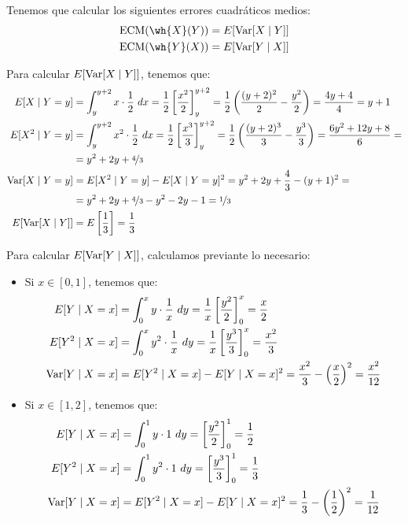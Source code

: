 \begin{ejercicio}
    Tenemos que calcular los siguientes errores cuadráticos medios:
    \begin{align*}
        \text{ECM}(\wh{X}(Y)) &= E[\Var[X\mid Y]]\\
        \text{ECM}(\wh{Y}(X)) &= E[\Var[Y\mid X]]
    \end{align*}

    Para calcular $E[\operatorname{Var}[X\mid Y]]$, tenemos que:
    \begin{align*}
        E[X\mid Y=y] &= \int_{y}^{y+2} x\cdot \dfrac{1}{2} \ dx
        = \dfrac{1}{2}\left[\dfrac{x^2}{2}\right]_{y}^{y+2}
        = \dfrac{1}{2}\left(\dfrac{(y+2)^2}{2}-\dfrac{y^2}{2}\right)
        = \dfrac{4y+4}{4} = y+1\\
        E[X^2\mid Y=y] &= \int_{y}^{y+2} x^2\cdot \dfrac{1}{2} \ dx
        = \dfrac{1}{2}\left[\dfrac{x^3}{3}\right]_{y}^{y+2}
        = \dfrac{1}{2}\left(\dfrac{(y+2)^3}{3}-\dfrac{y^3}{3}\right)
        = \dfrac{6y^2+12y+8}{6} =\\&= y^2+2y+\nicefrac{4}{3}\\
        \operatorname{Var}[X\mid Y=y] &= E[X^2\mid Y=y]-E[X\mid Y=y]^2
        = y^2+2y+\dfrac{4}{3}-(y+1)^2
        =\\&= y^2+2y+\nicefrac{4}{3}-y^2-2y-1
        = \nicefrac{1}{3}\\
        E[\operatorname{Var}[X\mid Y]] &= E\left[\dfrac{1}{3}\right] = \dfrac{1}{3}
    \end{align*}

    Para calcular $E[\operatorname{Var}[Y\mid X]]$, calculamos previante lo necesario:
    \begin{itemize}
        \item Si $x\in [0,1]$, tenemos que:
        \begin{align*}
            E[Y\mid X=x] &= \int_{0}^{x} y\cdot \frac{1}{x} \ dy
            = \frac{1}{x}\left[\frac{y^2}{2}\right]_{0}^{x} = \frac{x}{2}\\
            E[Y^2\mid X=x] &= \int_{0}^{x} y^2\cdot \frac{1}{x} \ dy
            = \frac{1}{x}\left[\frac{y^3}{3}\right]_{0}^{x} = \frac{x^2}{3}\\
            \operatorname{Var}[Y\mid X=x] &= E[Y^2\mid X=x]-E[Y\mid X=x]^2
            = \frac{x^2}{3}-\left(\frac{x}{2}\right)^2
            = \frac{x^2}{12}
        \end{align*}

        \item Si $x\in [1,2]$, tenemos que:
        \begin{align*}
            E[Y\mid X=x] &= \int_{0}^{1} y\cdot 1 \ dy
            = \left[\frac{y^2}{2}\right]_{0}^{1} = \frac{1}{2} \\
            E[Y^2\mid X=x] &= \int_{0}^{1} y^2\cdot 1 \ dy
            = \left[\frac{y^3}{3}\right]_{0}^{1} = \frac{1}{3} \\
            \operatorname{Var}[Y\mid X=x] &= E[Y^2\mid X=x]-E[Y\mid X=x]^2
            = \frac{1}{3}-\left(\frac{1}{2}\right)^2 = \frac{1}{12}
        \end{align*}


\end{itemize}
\end{ejercicio}
